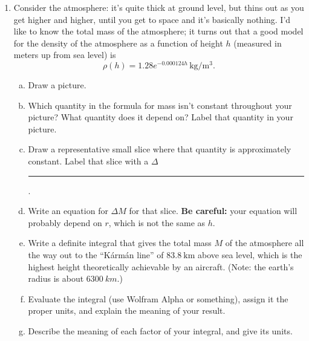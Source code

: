 \documentclass[12pt]{article}
\begin{document}
\begin{enumerate}
\item Consider the atmosphere: it's quite thick at ground level, but thins out as you get higher and higher, until you get to space and it's basically nothing. I'd like to know the total mass of the atmosphere; it turns out that a good model for the density of the atmosphere as a function of height \(h\) (measured in meters up from sea level) is
\[ \rho(h) = 1.28 e^{-0.000124 h}\, \unit{\kg/\m^3}.\]
\begin{enumerate}[(a)]
    \item Draw a picture.
    \item Which quantity in the formula for mass isn't constant throughout your picture? What quantity does it depend on? Label that quantity in your picture.
    \item Draw a representative small slice where that quantity is approximately constant. Label that slice with a \(\Delta\)\rule{0.5cm}{0.15mm}.
    \item Write an equation for \(\Delta M\) for that slice. \textbf{Be careful:} your equation will probably depend on \(r\), which is not the same as \(h\).
    \item Write a definite integral that gives the total mass \(M\) of the atmosphere all the way out to the ``Kármán line'' of \(\qty{83.8}{\km}\) above sea level, which is the highest height theoretically achievable by an aircraft. (Note: the earth's radius is about \(\qty{6300}{km}\).)
    \item Evaluate the integral (use Wolfram Alpha or something), assign it the proper units, and explain the meaning of your result.
    \item Describe the meaning of each factor of your integral, and give its units.
\end{enumerate}


\end{enumerate}
\end{document}
